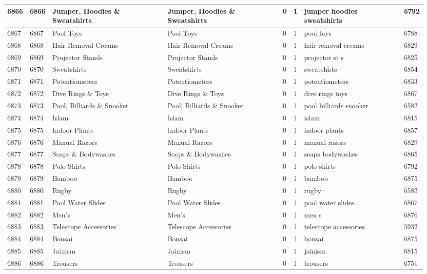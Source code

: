 \begin{longtable}{|l|l|l|l|l|l|l|l|}
6866 & 6866 & Jumper, Hoodies \& Sweatshirts & Jumper, Hoodies \& Sweatshirts & 0 & 1 & jumper hoodies sweatshirts & 6792 \\ \hline 
6867 & 6867 & Pool Toys & Pool Toys & 0 & 1 & pool toys & 6788 \\ \hline 
6868 & 6868 & Hair Removal Creams & Hair Removal Creams & 0 & 1 & hair removal creams & 6829 \\ \hline 
6869 & 6869 & Projector Stands & Projector Stands & 0 & 1 & projector st s & 6825 \\ \hline 
6870 & 6870 & Sweatshirts & Sweatshirts & 0 & 1 & sweatshirts & 6854 \\ \hline 
6871 & 6871 & Potentiometers & Potentiometers & 0 & 1 & potentiometers & 6833 \\ \hline 
6872 & 6872 & Dive Rings \& Toys & Dive Rings \& Toys & 0 & 1 & dive rings toys & 6867 \\ \hline 
6873 & 6873 & Pool, Billiards \& Snooker & Pool, Billiards \& Snooker & 0 & 1 & pool billiards snooker & 6582 \\ \hline 
6874 & 6874 & Islam & Islam & 0 & 1 & islam & 6815 \\ \hline 
6875 & 6875 & Indoor Plants & Indoor Plants & 0 & 1 & indoor plants & 6857 \\ \hline 
6876 & 6876 & Manual Razors & Manual Razors & 0 & 1 & manual razors & 6829 \\ \hline 
6877 & 6877 & Soaps \& Bodywashes & Soaps \& Bodywashes & 0 & 1 & soaps bodywashes & 6865 \\ \hline 
6878 & 6878 & Polo Shirts & Polo Shirts & 0 & 1 & polo shirts & 6792 \\ \hline 
6879 & 6879 & Bamboo & Bamboo & 0 & 1 & bamboo & 6875 \\ \hline 
6880 & 6880 & Rugby & Rugby & 0 & 1 & rugby & 6582 \\ \hline 
6881 & 6881 & Pool Water Slides & Pool Water Slides & 0 & 1 & pool water slides & 6867 \\ \hline 
6882 & 6882 & Men's & Men's & 0 & 1 & men s & 6876 \\ \hline 
6883 & 6883 & Telescope Accessories & Telescope Accessories & 0 & 1 & telescope accessories & 5932 \\ \hline 
6884 & 6884 & Bonsai & Bonsai & 0 & 1 & bonsai & 6875 \\ \hline 
6885 & 6885 & Jainism & Jainism & 0 & 1 & jainism & 6815 \\ \hline 
6886 & 6886 & Trousers & Trousers & 0 & 1 & trousers & 6751 \\ \hline 

\end{longtable}
